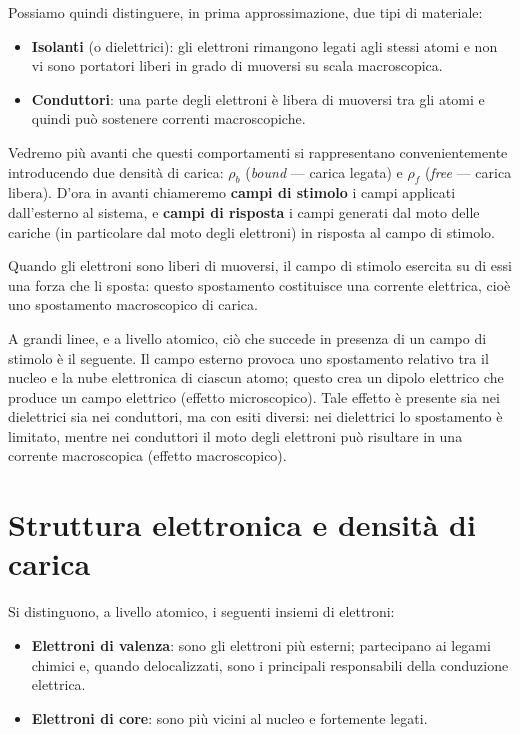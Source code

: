\documentclass{book}
\begin{document}
Possiamo quindi distinguere, in prima approssimazione, due tipi di materiale:
\begin{itemize}
  \item \textbf{Isolanti} (o dielettrici): gli elettroni rimangono legati agli stessi atomi e non vi sono portatori liberi in grado di muoversi su scala macroscopica.
  \item \textbf{Conduttori}: una parte degli elettroni è libera di muoversi tra gli atomi e quindi può sostenere correnti macroscopiche.
\end{itemize}

Vedremo più avanti che questi comportamenti si rappresentano convenientemente introducendo due densità di carica: $\rho_b$ (\emph{bound} — carica legata) e $\rho_f$ (\emph{free} — carica libera). D'ora in avanti chiameremo \textbf{campi di stimolo} i campi applicati dall'esterno al sistema, e \textbf{campi di risposta} i campi generati dal moto delle cariche (in particolare dal moto degli elettroni) in risposta al campo di stimolo.

Quando gli elettroni sono liberi di muoversi, il campo di stimolo esercita su di essi una forza che li sposta: questo spostamento costituisce una corrente elettrica, cioè uno spostamento macroscopico di carica.

A grandi linee, e a livello atomico, ciò che succede in presenza di un campo di stimolo è il seguente. Il campo esterno provoca uno spostamento relativo tra il nucleo e la nube elettronica di ciascun atomo; questo crea un dipolo elettrico che produce un campo elettrico (effetto microscopico). Tale effetto è presente sia nei dielettrici sia nei conduttori, ma con esiti diversi: nei dielettrici lo spostamento è limitato, mentre nei conduttori il moto degli elettroni può risultare in una corrente macroscopica (effetto macroscopico).

\section*{Struttura elettronica e densità di carica}

Si distinguono, a livello atomico, i seguenti insiemi di elettroni:
\begin{itemize}
  \item \textbf{Elettroni di valenza}: sono gli elettroni più esterni; partecipano ai legami chimici e, quando delocalizzati, sono i principali responsabili della conduzione elettrica.
  \item \textbf{Elettroni di core}: sono più vicini al nucleo e fortemente legati.
\end{itemize}
\end{document}
